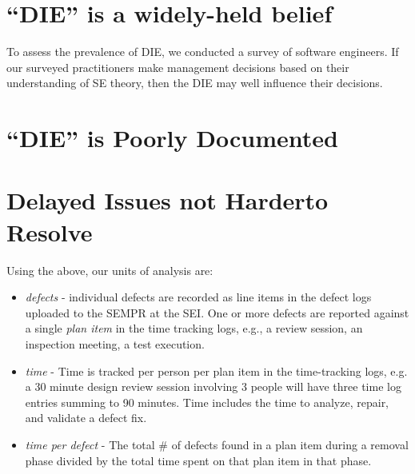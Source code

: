 \documentclass{sig-alternate}
\newcommand{\todo}[1]{\textcolor{Maroon}{TODO: #1}}
\newcommand{\bi}{\begin{itemize}}%
\newcommand{\ei}{\end{itemize}}
\newcommand{\fig}[1]{Figure~\ref{fig:#1}}
\begin{document}
\section{``DIE'' is a  widely-held belief}
To assess the prevalence of DIE,   we conducted a survey of software engineers. If our surveyed practitioners make management decisions based on their
understanding of SE theory, then the DIE  may well influence their decisions.



\section{``DIE'' is Poorly  Documented}
 










%
 

\section{Delayed Issues not  Harder\newline to Resolve}





Using the above,
our units of analysis are:
\bi
    \item \emph{defects} - individual defects are recorded as line items in the defect logs uploaded to the SEMPR at the SEI. One or more defects are reported against a single \emph{plan item} in the time tracking logs, e.g., a review session, an inspection meeting, a test execution.
    \item \emph{time} - Time is tracked per person per plan item in the time-tracking logs, e.g. a 30 minute design review session involving 3 people will have three time log entries summing to 90 minutes. Time includes the time to analyze, repair, and validate a defect fix.
    \item \emph{time per defect} - The total \# of defects found in a plan item during a removal phase divided by the total time spent on that plan item in that phase.
\ei


\end{document}
